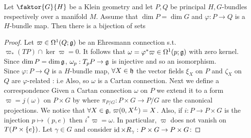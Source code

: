 \documentclass{article}
\begin{document}
\begin{theorem}
Let $\faktor{G}{H}$ be a Klein geometry and let $P,Q$ be principal $H,G$-bundles respectively over a manifold $M$. Assume that $\dim P = \dim G $ and $\varphi : P \to Q$ is a $H$-bundle map. Then there is a bijection of sets 
\end{theorem}
\begin{proof}
Let $\varpi \in \Omega^1(Q;\mathfrak{g})$ be an Ehresmann connection s.t. $\varpi_\ast(TP) \cap \ker \varpi = 0$. It follows that $\omega = \varphi^\ast \varpi \in \Omega^1(p;\mathfrak{g})$ with zero kernel. Since $\dim P = \dim \mathfrak{g}$, $\omega_p : T_pP \to \mathfrak{g}$ is injective and so an isomorphism. \\
Since $\varphi : P \to Q$ is a $H$-bundle map, $\forall X \in \mathfrak{h}$ the vector fields $\xi_X$ on $P$ and $\zeta_X$ on $Q$ are $\varphi$-related : i.e
Also, 
so $\omega$ is a Cartan connection. Next we define a correspondence 
Given a Cartan connection $\omega$ on $P$ we extend it to a form $\varpi = j(\omega)$ on $P\times G$ by 
where $\pi_{P/G}:P\times G \to P/G$ are the canonical projections. We notice that $\forall X \in \mathfrak{g}, \, \varpi(0,X^L) = X$. Also, if $i: P \to P\times G$ is the injection $p \mapsto (p,e)$ then $i^\ast \varpi = \omega$. In particular, $\varpi$ does not vanish on $T(P \times \left\{ e \right\})$. Let $\gamma \in G$ and consider $\operatorname{id} \times R_\gamma: P\times G \to P \times G$:
\end{proof}
\end{document}
